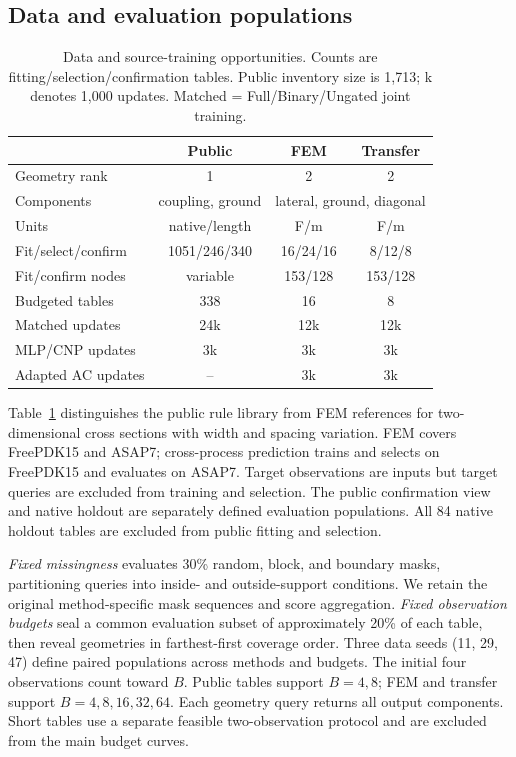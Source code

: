 \documentclass[conference,10pt,letterpaper]{IEEEtran}
\begin{document}
\subsection{Data and evaluation populations}
\begin{table}[t]
\centering\caption{Data and source-training opportunities. Counts are fitting/selection/confirmation tables. Public inventory size is 1,713; k denotes 1,000 updates. Matched = Full/Binary/Ungated joint training.}
\label{tab:data}
\small\setlength{\tabcolsep}{3pt}
\begin{tabular}{lccc}\toprule
 & Public & FEM & Transfer\\\midrule
Geometry rank & 1 & 2 & 2\\
Components & coupling, ground & \multicolumn{2}{c}{lateral, ground, diagonal}\\
Units & native/length & F/m & F/m\\
Fit/select/confirm & 1051/246/340 & 16/24/16 & 8/12/8\\
Fit/confirm nodes & variable & 153/128 & 153/128\\
Budgeted tables & 338 & 16 & 8\\
Matched updates & 24k & 12k & 12k\\
MLP/CNP updates & 3k & 3k & 3k\\
Adapted AC updates & -- & 3k & 3k\\\bottomrule
\end{tabular}
\end{table}
Table~\ref{tab:data} distinguishes the public rule library from FEM references for two-dimensional cross sections with width and spacing variation. FEM covers FreePDK15 and ASAP7; cross-process prediction trains and selects on FreePDK15 and evaluates on ASAP7. Target observations are inputs but target queries are excluded from training and selection. The public confirmation view and native holdout are separately defined evaluation populations. All 84 native holdout tables are excluded from public fitting and selection.

\emph{Fixed missingness} evaluates 30\% random, block, and boundary masks, partitioning queries into inside- and outside-support conditions. We retain the original method-specific mask sequences and score aggregation. \emph{Fixed observation budgets} seal a common evaluation subset of approximately 20\% of each table, then reveal geometries in farthest-first coverage order. Three data seeds (11, 29, 47) define paired populations across methods and budgets. The initial four observations count toward $B$. Public tables support $B=4,8$; FEM and transfer support $B=4,8,16,32,64$. Each geometry query returns all output components. Short tables use a separate feasible two-observation protocol and are excluded from the main budget curves.
\end{document}

